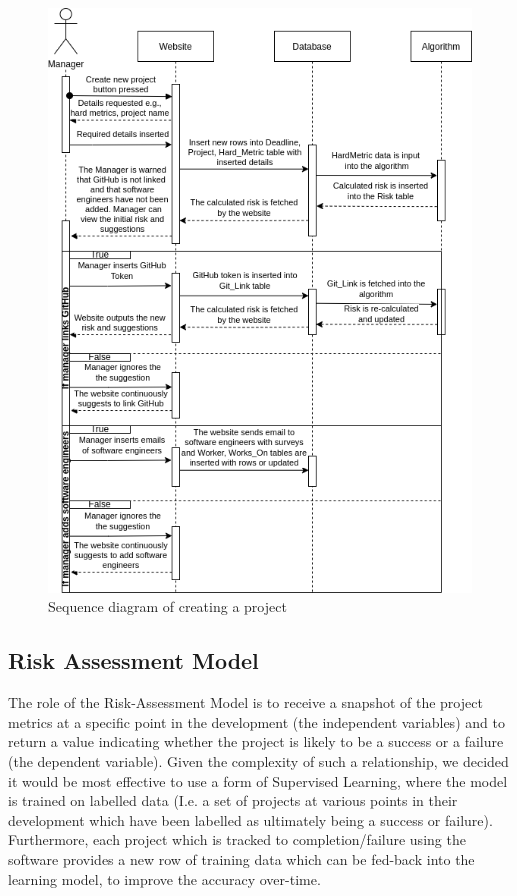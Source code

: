 \documentclass[a4paper]{article}
\theoremstyle{plain}
\theoremstyle{definition}
\theoremstyle{remark}
\begin{document}
\begin{figure}[H]
\begin{minipage}{0.5\textwidth}
        \centering
        \includegraphics[width=1\textwidth]{sequence.png} %
        \caption{Sequence diagram of creating a project}
	\label{sequence}
    \end{minipage}
\end{figure}
\subsection*{Risk Assessment Model}
The role of the Risk-Assessment Model is to receive a snapshot of the project metrics at a specific point in the development (the independent variables) and to return a value indicating whether the project is likely to be a success or a failure (the dependent variable). Given the complexity of such a relationship, we decided it would be most effective to use a form of Supervised Learning, where the model is trained on labelled data (I.e. a set of projects at various points in their development which have been labelled as ultimately being a success or failure). Furthermore, each project which is tracked to completion/failure using the software provides a new row of training data which can be fed-back into the learning model, to improve the accuracy over-time.\\
 
\end{document}

